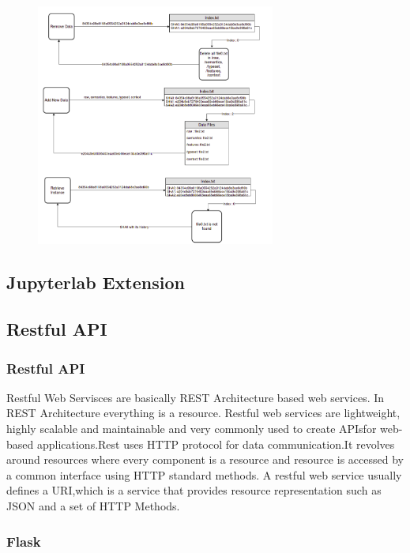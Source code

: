 \documentclass[12pt,twoside]{article}
\begin{document}
		\begin{figure}[!ht]
			\centering
			\includegraphics[width=0.7\textwidth]{figures/datadelete.png}
		\end{figure}
		
		
		\subsection*{Jupyterlab Extension}
		
		\subsection*{Restful API}
		
		\subsubsection*{Restful API}
		
		\par Restful Web Servisces are basically REST Architecture based web services. In REST Architecture everything is a resource. Restful web services are lightweight, highly scalable and maintainable and very commonly used to create APIsfor web-based applications.Rest uses HTTP protocol for data communication.It revolves around resources where every component is a resource and resource is accessed by a common interface using HTTP standard methods. A restful web service usually defines a URI,which is a service that provides resource representation such as JSON and a set of HTTP Methods.
		
		\subsubsection*{Flask}
		
\end{document}
